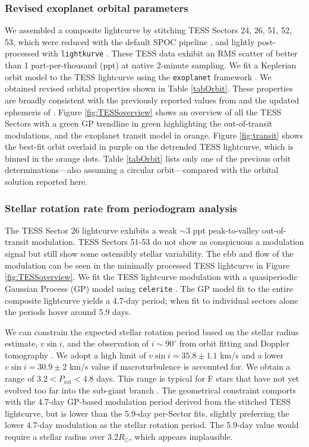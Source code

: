 \documentclass[twocolumn]{aastex631}
\begin{document}
\subsubsection{Revised exoplanet orbital parameters}
We assembled a composite lightcurve by stitching TESS Sectors 24, 26, 51, 52, 53, which were reduced with the default SPOC pipeline \citep{2020RNAAS...4..201C}, and lightly post-processed with \texttt{lightkurve} \citep{geert_barentsen_2019_2565212}.  These TESS data exhibit an RMS scatter of better than 1 part-per-thousand (ppt) at native 2-minute sampling.  We fit a Keplerian orbit model to the TESS lightcurve using the \texttt{exoplanet} framework \citep{exoplanet:joss}.  We obtained revised orbital properties shown in Table \ref{tabOrbit}.  These properties are broadly consistent with the previously reported values from \citet{2017AJ....153..211Z} and the updated ephemeris of \citet{2022ApJS..259...62I}.  Figure \ref{fig:TESSoverview} shows an overview of all the TESS Sectors with a green GP trendline in green highlighting the out-of-transit modulations, and the exoplanet transit model in orange.  Figure \ref{fig:transit} shows the best-fit orbit overlaid in purple on the detrended TESS lightcurve, which is binned in the orange dots.  Table \ref{tabOrbit} lists only one of the previous orbit determinations---also assuming a circular orbit---compared with the orbital solution reported here.

\subsubsection{Stellar rotation rate from periodogram analysis}\label{TESSmodulation}

The TESS Sector 26 lightcurve exhibits a weak $\sim$3 ppt peak-to-valley out-of-transit modulation. TESS Sectors 51-53 do not show as conspicuous a modulation signal but still show some ostensibly stellar variability.  The ebb and flow of the modulation can be seen in the minimally processed TESS lightcurve in Figure \ref{fig:TESSoverview}.  We fit the TESS lightcurve modulation with a quasiperiodic Gaussian Process (GP) model using \texttt{celerite} \citep{celerite1,celerite2}.  The GP model fit to the entire composite lightcurve yields a 4.7-day period; when fit to individual sectors alone the periods hover around 5.9 days.

We can constrain the expected stellar rotation period based on the stellar radius estimate, $v\sin{i}$, and the observation of $i\sim90^\circ$ from orbit fitting and Doppler tomography \citep{2017AJ....153..211Z}.  We adopt a high limit of $v\sin{i}=35.8\pm1.1$ km/s and a lower $v\sin{i}=30.9\pm2$ km/s value if macroturbulence is accounted for.  We obtain a range of $3.2 < P_\mathrm{rot}  < 4.8 $ days.  This range is typical for F stars that have not yet evolved too far into the sub-giant branch \citep{2022ApJ...930....7A}.  The geometrical constraint comports with the 4.7-day GP-based modulation period derived from the stitched TESS lightcurve, but is lower than the 5.9-day per-Sector fits, slightly preferring the lower 4.7-day modulation as the stellar rotation period.  The 5.9-day value would require a stellar radius over 3.2$R_\odot$, which appears implausible.
\end{document}
